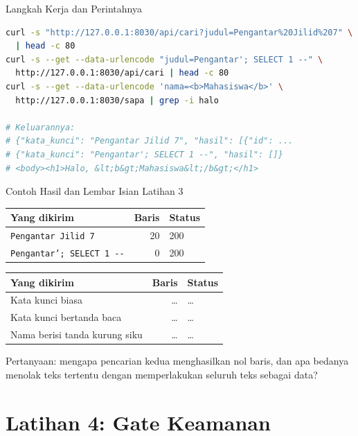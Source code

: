 \documentclass[aspectratio=169, table, 12pt]{beamer}
\begin{document}
\begin{frame}[fragile]{{\Large Langkah Kerja dan Perintahnya}}
  \vspace{2pt}
\begin{lstlisting}[language=bash]
curl -s "http://127.0.0.1:8030/api/cari?judul=Pengantar%20Jilid%207" \
  | head -c 80
curl -s --get --data-urlencode "judul=Pengantar'; SELECT 1 --" \
  http://127.0.0.1:8030/api/cari | head -c 80
curl -s --get --data-urlencode 'nama=<b>Mahasiswa</b>' \
  http://127.0.0.1:8030/sapa | grep -i halo

# Keluarannya:
# {"kata_kunci": "Pengantar Jilid 7", "hasil": [{"id": ...
# {"kata_kunci": "Pengantar'; SELECT 1 --", "hasil": []}
# <body><h1>Halo, &lt;b&gt;Mahasiswa&lt;/b&gt;</h1>
\end{lstlisting}
\end{frame}

\begin{frame}{{\Large Contoh Hasil dan Lembar Isian Latihan 3}}
  \vspace{4pt}
  \centering
  {\footnotesize
  \begin{tabularx}{\textwidth}{Yrl}
    \hline
    \textbf{Yang dikirim} & \textbf{Baris} & \textbf{Status} \\
    \hline
    \texttt{Pengantar Jilid 7} & 20 & 200 \\
    \hline
    \texttt{Pengantar'; SELECT 1 -{}-} & 0 & 200 \\
    \hline
  \end{tabularx}}

  \vspace{6pt}
  \centering
  {\footnotesize
  \begin{tabularx}{\textwidth}{Yrl}
    \hline
    \textbf{Yang dikirim} & \textbf{Baris} & \textbf{Status} \\
    \hline
    Kata kunci biasa & \dots & \dots \\
    \hline
    Kata kunci bertanda baca & \dots & \dots \\
    \hline
    Nama berisi tanda kurung siku & \dots & \dots \\
    \hline
  \end{tabularx}}

  \vspace{4pt}
  {\footnotesize Pertanyaan: mengapa pencarian kedua menghasilkan nol baris,
  dan apa bedanya menolak teks tertentu dengan memperlakukan seluruh teks
  sebagai data?}
\end{frame}

\section{Latihan 4: Gate Keamanan}
\end{document}

